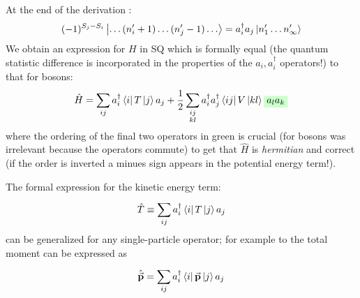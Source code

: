 \documentclass[../main/main.tex]{subfiles}
\begin{document}
At the end of the derivation \cite{fetter}:
\begin{equation*}
  (-1)^{S_j-S_i} \ket{\dots (n_i' +1) \dots (n_j'-1) \dots } = a_i ^\dag  a_j \ket{n_1' \dots n_ \infty '}
\end{equation*}
We obtain an expression for \( H \) in SQ which is formally equal (the quantum statistic difference is incorporated in the properties of the \( a_i, a_i ^\dag  \) operators!) to that for bosons:
\begin{equation}
  \hat{H} = \sum_{ij}^{} a_i^\dag \bra{i}T \ket{j} a_j +
  \frac{1}{2} \sum_{\substack{ij \\ kl} }^{} a_i^\dag a_j^\dag \bra{ij} V \ket{kl} \mathcolorbox{green!20}{a_l a_k}
\end{equation}
where the ordering of the final two operators in green is crucial (for bosons was irrelevant because the operators commute) to get that \( \hat{H}  \) is \emph{hermitian} and correct (if the order is inverted a minues sign appears in the potential energy term!).

\begin{remark}
The formal expression for the kinetic energy term:
\begin{equation*}
  \hat{T} \equiv \sum_{ij}^{} a_i ^\dag  \bra{i}  T \ket{j} a_j
\end{equation*}
can be generalized for any single-particle operator; for example to the total moment can be expressed as
\begin{equation*}
  \hat{\va{p}} = \sum_{ij}^{} a_i ^\dag  \bra{i} \va{p } \ket{j} a_j
\end{equation*}
\end{remark}
\end{document}
